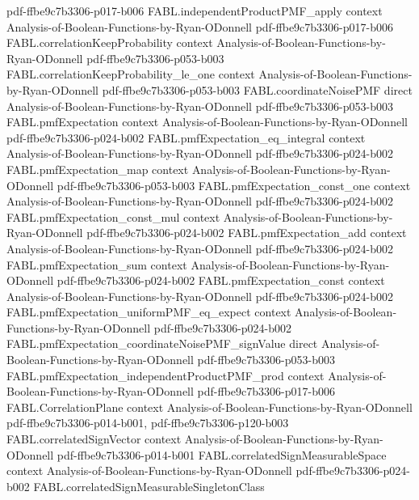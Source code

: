 \begin{theorem}
  {pdf-ffbe9c7b3306-p017-b006}
\proofstep
  {FABL.independentProductPMF_apply}
  {context}
  {Analysis-of-Boolean-Functions-by-Ryan-ODonnell}
  {pdf-ffbe9c7b3306-p017-b006}
\proofstep
  {FABL.correlationKeepProbability}
  {context}
  {Analysis-of-Boolean-Functions-by-Ryan-ODonnell}
  {pdf-ffbe9c7b3306-p053-b003}
\proofstep
  {FABL.correlationKeepProbability_le_one}
  {context}
  {Analysis-of-Boolean-Functions-by-Ryan-ODonnell}
  {pdf-ffbe9c7b3306-p053-b003}
\proofstep
  {FABL.coordinateNoisePMF}
  {direct}
  {Analysis-of-Boolean-Functions-by-Ryan-ODonnell}
  {pdf-ffbe9c7b3306-p053-b003}
\proofstep
  {FABL.pmfExpectation}
  {context}
  {Analysis-of-Boolean-Functions-by-Ryan-ODonnell}
  {pdf-ffbe9c7b3306-p024-b002}
\proofstep
  {FABL.pmfExpectation_eq_integral}
  {context}
  {Analysis-of-Boolean-Functions-by-Ryan-ODonnell}
  {pdf-ffbe9c7b3306-p024-b002}
\proofstep
  {FABL.pmfExpectation_map}
  {context}
  {Analysis-of-Boolean-Functions-by-Ryan-ODonnell}
  {pdf-ffbe9c7b3306-p053-b003}
\proofstep
  {FABL.pmfExpectation_const_one}
  {context}
  {Analysis-of-Boolean-Functions-by-Ryan-ODonnell}
  {pdf-ffbe9c7b3306-p024-b002}
\proofstep
  {FABL.pmfExpectation_const_mul}
  {context}
  {Analysis-of-Boolean-Functions-by-Ryan-ODonnell}
  {pdf-ffbe9c7b3306-p024-b002}
\proofstep
  {FABL.pmfExpectation_add}
  {context}
  {Analysis-of-Boolean-Functions-by-Ryan-ODonnell}
  {pdf-ffbe9c7b3306-p024-b002}
\proofstep
  {FABL.pmfExpectation_sum}
  {context}
  {Analysis-of-Boolean-Functions-by-Ryan-ODonnell}
  {pdf-ffbe9c7b3306-p024-b002}
\proofstep
  {FABL.pmfExpectation_const}
  {context}
  {Analysis-of-Boolean-Functions-by-Ryan-ODonnell}
  {pdf-ffbe9c7b3306-p024-b002}
\proofstep
  {FABL.pmfExpectation_uniformPMF_eq_expect}
  {context}
  {Analysis-of-Boolean-Functions-by-Ryan-ODonnell}
  {pdf-ffbe9c7b3306-p024-b002}
\proofstep
  {FABL.pmfExpectation_coordinateNoisePMF_signValue}
  {direct}
  {Analysis-of-Boolean-Functions-by-Ryan-ODonnell}
  {pdf-ffbe9c7b3306-p053-b003}
\proofstep
  {FABL.pmfExpectation_independentProductPMF_prod}
  {context}
  {Analysis-of-Boolean-Functions-by-Ryan-ODonnell}
  {pdf-ffbe9c7b3306-p017-b006}
\proofstep
  {FABL.CorrelationPlane}
  {context}
  {Analysis-of-Boolean-Functions-by-Ryan-ODonnell}
  {pdf-ffbe9c7b3306-p014-b001,
    pdf-ffbe9c7b3306-p120-b003}
\proofstep
  {FABL.correlatedSignVector}
  {context}
  {Analysis-of-Boolean-Functions-by-Ryan-ODonnell}
  {pdf-ffbe9c7b3306-p014-b001}
\proofstep
  {FABL.correlatedSignMeasurableSpace}
  {context}
  {Analysis-of-Boolean-Functions-by-Ryan-ODonnell}
  {pdf-ffbe9c7b3306-p024-b002}
\proofstep
  {FABL.correlatedSignMeasurableSingletonClass}

\end{theorem}

